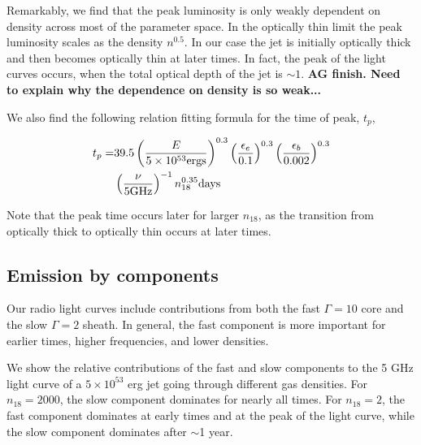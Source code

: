 \documentclass[usenatbib,fleqn]{mnras}
\begin{document}
Remarkably, we find that the peak luminosity is only weakly dependent
on density across most of the parameter space. In the optically thin
limit the peak luminosity scales as the density $n^{0.5}$. In our case
the jet is initially optically thick and then becomes optically thin
at later times. In fact, the peak of the light curves occurs, when the
total optical depth of the jet is $\sim 1$. {\bf AG finish. Need to
  explain why the dependence on density is so weak...}


We also find the following relation fitting formula for the time of
peak, $t_p$, 

\begin{align}
  t_p =& 39.5 \left(\frac{E}{5 \times 10^{53} {\rm ergs}}\right)^{0.3}   \left(\frac{\epsilon_e}{0.1}\right)^{0.3}
  \left(\frac{\epsilon_b}{0.002}\right)^{0.3}\nonumber\\
 & \left(\frac{\nu}{5 {\rm GHz}}\right)^{-1} n_{18}^{0.35}  {\rm days}
\label{eq:peakTime}
\end{align}

Note that the peak time occurs later for larger $n_{18}$, as the
transition from optically thick to optically thin occurs at later times.

\subsection{Emission by components}
Our radio light curves include contributions from both the fast
$\Gamma=10$ core and the slow $\Gamma=2$ sheath. In general, the fast
component is more important for earlier times, higher frequencies, and
lower densities. 

We show the relative contributions of the fast and slow components to
the 5 GHz light curve of a $5 \times 10^{53}$ erg jet going through
different gas densities. For $n_{18}=2000$, the slow component
dominates for nearly all times.  For $n_{18}=2$, the fast component
dominates at early times and at the peak of the light curve, while the
slow component dominates after $\sim$1 year.
\end{document}

